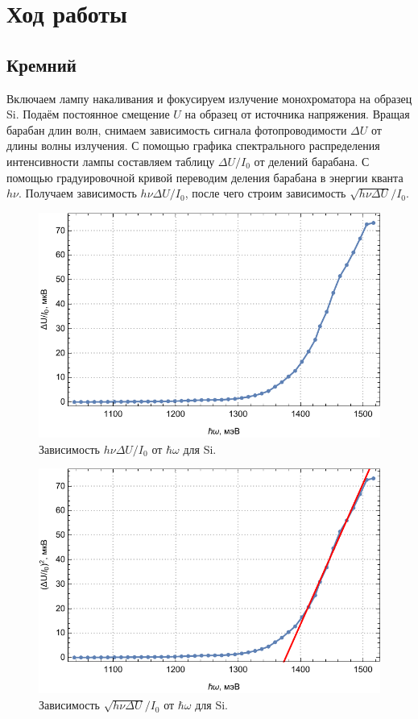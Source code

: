 \documentclass[a4paper, 12pt]{article}
\begin{document}
    \section{Ход работы}
    \subsection{Кремний}
    Включаем лампу накаливания и фокусируем излучение монохроматора на образец Si. Подаём постоянное смещение $U$ на образец от источника напряжения. Вращая барабан длин волн, снимаем зависимость сигнала фотопроводимости $\Delta U$ от длины волны излучения. С помощью графика спектрального распределения интенсивности лампы составляем таблицу $\Delta U/I_0$ от делений барабана. С помощью градуировочной кривой переводим деления барабана в энергии кванта $h\nu$. Получаем зависимость $h\nu\Delta U/I_0$, после чего строим зависимость $\sqrt{h\nu\Delta U}/I_0$.
    \begin{figure}[!htb]
        \centering
        \includegraphics[scale=1]{plot1.pdf}
        \caption{Зависимость $h\nu\Delta U/I_0$ от $\hbar\omega$ для Si.}
    \end{figure}
    \begin{figure}[!htb]
        \centering
        \includegraphics[scale=1]{plot2.pdf}
        \caption{Зависимость $\sqrt{h\nu\Delta U}/I_0$ от $\hbar\omega$ для Si.}
    \end{figure}
\end{document}
